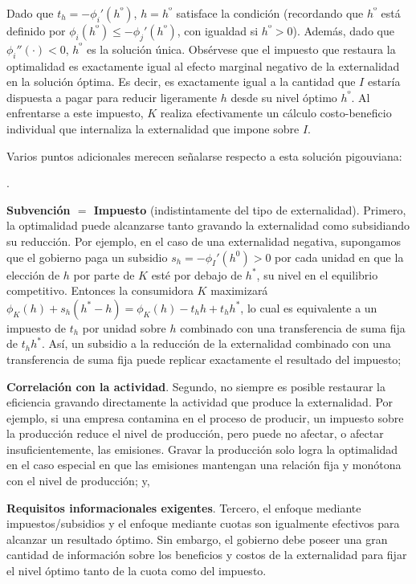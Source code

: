 \documentclass[10pt,a4paper]{article}
\newcounter{numitem}
\newenvironment{lnum}
      {\begin{list}{\arabic{numitem}.}{%
          \usecounter{numitem}%
          \setlength{\leftmargin}{1cm}%
          \setlength{\parskip}{3pt}%
          \setlength{\itemsep}{0pt}%
          \setlength{\parsep}{0pt}%
      }}
      {\end{list}}
\begin{document}
Dado que $t_h = -\phi_i'(h^º)$, $h = h^º$ satisface la condición (recordando que $h^º$ está definido por $\phi_i(h^º) \le -\phi_j'(h^º)$, con igualdad si $h^º > 0$). Además, dado que $\phi_i''(\cdot) < 0$, $h^º$ es la solución única. Obsérvese que el impuesto que restaura la optimalidad es exactamente igual al efecto marginal negativo de la externalidad en la solución óptima. Es decir, es exactamente igual a la cantidad que $I$ estaría dispuesta a pagar para reducir ligeramente $h$ desde su nivel óptimo $h^º$. Al enfrentarse a este impuesto, $K$ realiza efectivamente un cálculo costo-beneficio individual que internaliza la externalidad que impone sobre $I$.

Varios puntos adicionales merecen señalarse respecto a esta solución pigouviana:
\begin{lnum}
    \item \textbf{Subvención $=$ Impuesto} (indistintamente del tipo de externalidad). Primero, la optimalidad puede alcanzarse tanto gravando la externalidad como subsidiando su reducción. Por ejemplo, en el caso de una externalidad negativa, supongamos que el gobierno paga un subsidio $s_h = -\phi_I'(h^0) > 0$ por cada unidad en que la elección de $h$ por parte de $K$ esté por debajo de $h^*$, su nivel en el equilibrio competitivo. Entonces la consumidora $K$ maximizará $\phi_K(h) + s_h (h^* - h) = \phi_K(h) - t_h h + t_h h^*$, lo cual es equivalente a un impuesto de $t_h$ por unidad sobre $h$ combinado con una transferencia de suma fija de $t_h h^*$. Así, un subsidio a la reducción de la externalidad combinado con una transferencia de suma fija puede replicar exactamente el resultado del impuesto;
    \item \textbf{Correlación con la actividad}. Segundo, no siempre es posible restaurar la eficiencia gravando directamente la actividad que produce la externalidad. Por ejemplo, si una empresa contamina en el proceso de producir, un impuesto sobre la producción reduce el nivel de producción, pero puede no afectar, o afectar insuficientemente, las emisiones. Gravar la producción solo logra la optimalidad en el caso especial en que las emisiones mantengan una relación fija y monótona con el nivel de producción; y,
    \item \textbf{Requisitos informacionales exigentes}. Tercero, el enfoque mediante impuestos/subsidios y el enfoque mediante cuotas son igualmente efectivos para alcanzar un resultado óptimo. Sin embargo, el gobierno debe poseer una gran cantidad de información sobre los beneficios y costos de la externalidad para fijar el nivel óptimo tanto de la cuota como del impuesto.
\end{lnum}
\end{document}
